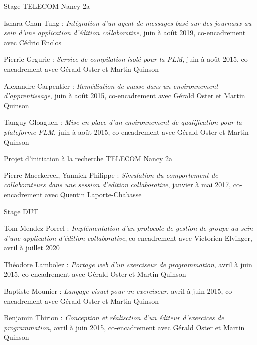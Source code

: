 \documentclass[12pt, a4paper]{awesome-cv}
\begin{document}
\begin{cventries}

\cventry
  {Stage TELECOM Nancy 2a}
  {~}
  {}
  {}
  {
    \vspace{-5mm}
    \begin{cvitems}
      \item Ishara Chan-Tung : \emph{Intégration d'un agent de messages basé sur des journaux au sein d'une application d'édition collaborative}, juin à août 2019, co-encadrement avec Cédric Enclos
      \item Pierric Grguric : \emph{Service de compilation isolé pour la PLM}, juin à août 2015, co-encadrement avec Gérald Oster et Martin Quinson
      \item Alexandre Carpentier : \emph{Remédiation de masse dans un environnement d'apprentissage}, juin à août 2015, co-encadrement avec Gérald Oster et Martin Quinson
      \item Tanguy Gloaguen : \emph{Mise en place d'un environnement de qualification pour la plateforme PLM}, juin à août 2015, co-encadrement avec Gérald Oster et Martin Quinson
    \end{cvitems}
}

\cventry
  {Projet d'initiation à la recherche TELECOM Nancy 2a}
  {~}
  {}
  {}
  {
    \vspace{-5mm}
    \begin{cvitems}
      \item Pierre Maeckereel, Yannick Philippe : \emph{Simulation du comportement de collaborateurs dans une session d’edition collaborative}, janvier à mai 2017, co-encadrement avec Quentin Laporte-Chabasse
    \end{cvitems}
  }

\cventry
  {Stage DUT}
  {~}
  {}
  {}
  {
    \vspace{-5mm}
    \begin{cvitems}
      \item Tom Mendez-Porcel : \emph{Implémentation d'un protocole de gestion de groupe au sein d'une application d'édition collaborative}, co-encadrement avec Victorien Elvinger, avril à juillet 2020
      \item Théodore Lambolez : \emph{Portage web d'un exerciseur de programmation}, avril à juin 2015, co-encadrement avec Gérald Oster et Martin Quinson
      \item Baptiste Mounier : \emph{Langage visuel pour un exerciseur}, avril à juin 2015, co-encadrement avec Gérald Oster et Martin Quinson
      \item Benjamin Thirion : \emph{Conception et réalisation d'un éditeur d'exercices de programmation}, avril à juin 2015, co-encadrement avec Gérald Oster et Martin Quinson
    \end{cvitems}
  }
\end{cventries}

\end{document}
